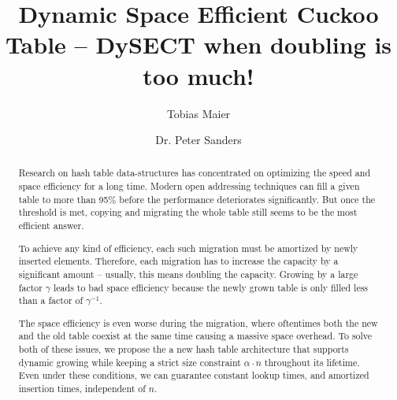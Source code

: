 \documentclass[a4paper,UKenglish]{lipics-v2016}
\title{Dynamic Space Efficient Cuckoo Table -- DySECT when doubling is too much!} %
\author[1]{Tobias Maier}
\author[1]{Dr. Peter Sanders}
\affil[1]{Karlsruhe Institute of Technology, Karlsruhe, Deutschland\\
  \texttt{\{t.maier, sanders\}@kit.edu}}
\begin{document}
\maketitle

\begin{abstract}
Research on hash table data-structures has concentrated on optimizing
the speed and space efficiency for a long time.  Modern open
addressing techniques can fill a given table to more than 95\% before
the performance deteriorates significantly.  But once the threshold is
met, copying and migrating the whole table still seems to be the most
efficient answer.

To achieve any kind of efficiency, each such migration must be
amortized by newly inserted elements.  Therefore, each migration has
to increase the capacity by a significant amount -- usually, this
means doubling the capacity.  Growing by a large factor $\gamma$ leads
to bad space efficiency because the newly grown table is only filled
less than a factor of $\gamma^{-1}$.

The space efficiency is even worse during the migration, where
oftentimes both the new and the old table coexist at the same time
causing a massive space overhead.  To solve both of these issues, we
propose the a new hash table architecture that supports dynamic
growing while keeping a strict size constraint $\alpha \cdot n$
throughout its lifetime.  Even under these conditions, we can
guarantee constant lookup times, and amortized insertion times,
independent of $n$.
 \end{abstract}
\end{document}
